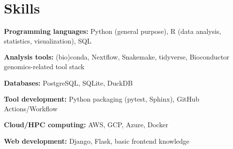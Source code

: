 \section{Skills}

\begin{entrylist}[itemsep=0.5ex]

\item \textbf{Programming languages:}
    Python (general purpose),
    R (data analysis, statistics, visualization),
    SQL

\item \textbf{Analysis tools:} (bio)conda, Nextflow, Snakemake, tidyverse, Bioconductor genomics-related tool stack

\item \textbf{Databases:} PostgreSQL, SQLite, DuckDB

\item \textbf{Tool development:} Python packaging (pytest, Sphinx), GitHub Actions/Workflow

\item \textbf{Cloud/HPC computing:} AWS, GCP, Azure, Docker

\item \textbf{Web development:} Django, Flask, basic front\-end knowledge


\end{entrylist}
